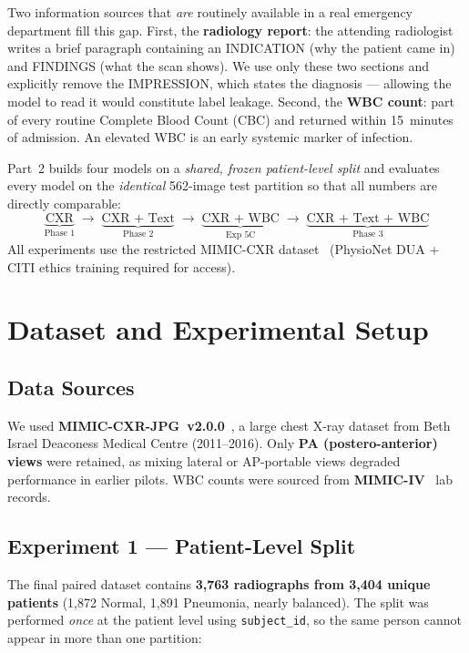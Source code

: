 \documentclass{article}
\begin{document}
Two information sources that \emph{are} routinely available in a real
emergency department fill this gap.
First, the \textbf{radiology report}: the attending radiologist writes a brief
paragraph containing an INDICATION (why the patient came in) and FINDINGS
(what the scan shows).
We use only these two sections and explicitly remove the IMPRESSION, which
states the diagnosis — allowing the model to read it would constitute
label leakage.
Second, the \textbf{WBC count}: part of every routine Complete Blood Count
(CBC) and returned within 15~minutes of admission.
An elevated WBC is an early systemic marker of infection.

Part~2 builds four models on a \emph{shared, frozen patient-level split}
and evaluates every model on the \emph{identical} 562-image test partition
so that all numbers are directly comparable:
\[
  \underbrace{\text{CXR}}_{\text{Phase 1}}
  \;\to\;
  \underbrace{\text{CXR + Text}}_{\text{Phase 2}}
  \;\to\;
  \underbrace{\text{CXR + WBC}}_{\text{Exp 5C}}
  \;\to\;
  \underbrace{\text{CXR + Text + WBC}}_{\text{Phase 3}}
\]
All experiments use the restricted MIMIC-CXR
dataset~\cite{johnson2019mimic} (PhysioNet DUA + CITI ethics training
required for access).

\section{Dataset and Experimental Setup}

\subsection{Data Sources}

We used \textbf{MIMIC-CXR-JPG~v2.0.0}~\cite{johnson2019mimic}, a large
chest X-ray dataset from Beth Israel Deaconess Medical Centre (2011--2016).
Only \textbf{PA (postero-anterior) views} were retained, as mixing lateral
or AP-portable views degraded performance in earlier pilots.
WBC counts were sourced from \textbf{MIMIC-IV}~\cite{johnson2023mimiciv}
lab records.

\subsection{Experiment 1 — Patient-Level Split}

The final paired dataset contains \textbf{3,763 radiographs from 3,404
unique patients} (1,872 Normal, 1,891 Pneumonia, nearly balanced).
The split was performed \emph{once} at the patient level using
\texttt{subject\_id}, so the same person cannot appear in more than one
partition:
\end{document}
